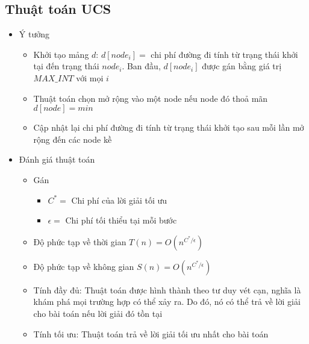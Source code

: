 \documentclass[a4paper, 12pt]{article}
\begin{document}
    \subsection{Thuật toán UCS}
    \begin{itemize}
        \item Ý tưởng
        \begin{itemize}
            \item Khởi tạo mảng $d$: $d[node_{i}] = $ chi phí đường đi tính từ trạng thái khởi tại đến trạng thái $node_{i}$. Ban đầu, $d[node_i]$ được gán bằng giá trị $MAX\_INT$ với mọi $i$
            \item Thuật toán chọn mở rộng vào một node nếu node đó thoả mãn $d[node] = min$
            \item Cập nhật lại chi phí đường đi tính từ trạng thái khởi tạo sau mỗi lần mở rộng đến các node kề
        \end{itemize}

        \item Đánh giá thuật toán
        \begin{itemize}
            \item Gán
            \begin{itemize}
                \item $C^* =$ Chi phí của lời giải tối ưu
                \item $\epsilon = $ Chi phí tối thiểu tại mỗi bước
            \end{itemize}
            \item Độ phức tạp về thời gian $T(n) = O(n^{C^*/\epsilon})$
            \item Độ phức tạp về không gian $S(n) = O(n^{C^*/\epsilon})$
            \item Tính đầy đủ: Thuật toán được hình thành theo tư duy vét cạn, nghĩa là khám phá mọi trường hợp có thể xảy ra. Do đó, nó có thể trả về lời giải cho bài toán nếu lời giải đó tồn tại
            \item Tính tối ưu: Thuật toán trả về lời giải tối ưu nhất cho bài toán
        \end{itemize}
    \end{itemize}
\end{document}

